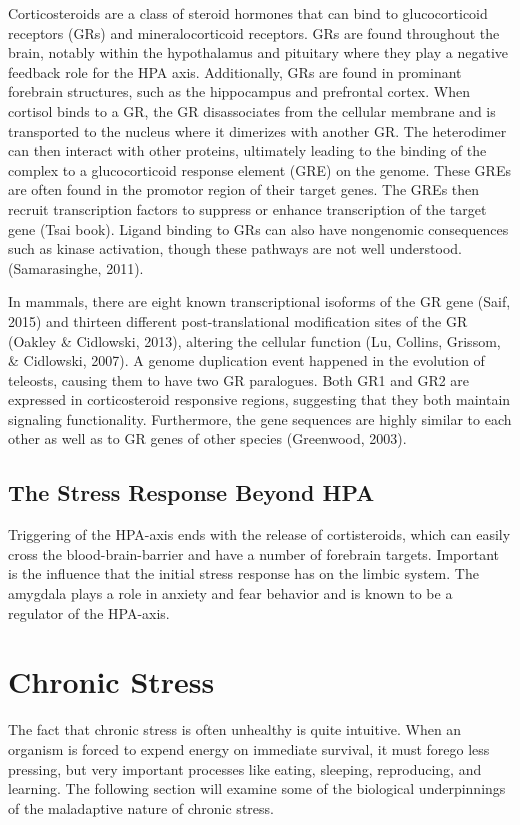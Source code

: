 \documentclass[12pt,twoside]{reedthesis}
\begin{document}
Corticosteroids are a class of steroid hormones that can bind to glucocorticoid receptors (GRs)
and mineralocorticoid receptors. GRs are found throughout
the brain, notably within the hypothalamus and pituitary where they play a negative
feedback role for the HPA axis. Additionally, GRs are found in prominant
forebrain structures, such as the hippocampus and prefrontal cortex. When
cortisol binds to a GR, the GR disassociates from the cellular membrane and is
transported to the nucleus where it dimerizes with another GR. The heterodimer
can then interact with other proteins, ultimately leading to the binding of the
complex to a glucocorticoid response element (GRE) on the genome. These GREs are often
found in the promotor region of their target genes. The GREs then recruit
transcription factors to suppress or enhance transcription of the target gene
(Tsai book).
Ligand binding to GRs can also have nongenomic consequences such as kinase
activation, though these pathways are not well understood.
(Samarasinghe, 2011).

In mammals, there are eight known transcriptional isoforms of the GR gene (Saif,
2015) and
thirteen different post-translational modification sites of the GR (Oakley \&
Cidlowski, 2013), altering the
cellular function (Lu, Collins, Grissom, \& Cidlowski, 2007). A genome duplication event happened in the evolution of teleosts, causing them
to have two GR paralogues. Both GR1 and GR2 are expressed in corticosteroid
responsive regions,
suggesting that they both maintain signaling functionality. Furthermore, the gene sequences are
highly similar to each other as well as to GR genes of other species (Greenwood,
2003).

\subsection{The Stress Response Beyond HPA}

Triggering of the HPA-axis ends with the release of cortisteroids, which can
easily cross the blood-brain-barrier and have a number of forebrain targets.
Important is the influence that the initial stress response has on the limbic
system. The amygdala plays a role in anxiety and fear behavior and is known to
be a regulator of the HPA-axis.

\section{Chronic Stress}
The fact that chronic stress is often unhealthy is quite intuitive. When an
organism is forced to expend energy on immediate survival, it must forego less
pressing, but very important processes like eating, sleeping, reproducing, and
learning. The following section will examine some of the biological
underpinnings of the maladaptive nature of chronic stress.  
\end{document}
